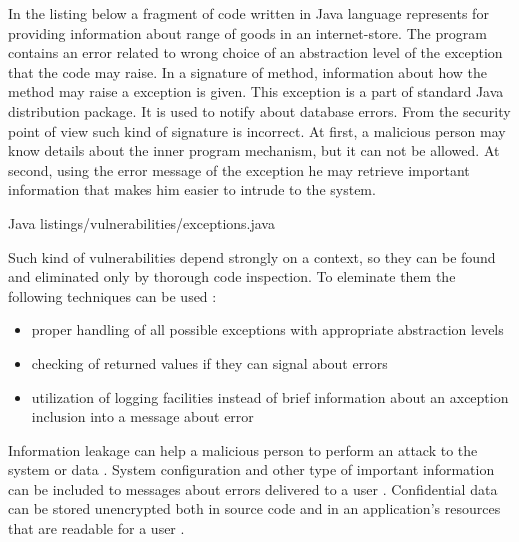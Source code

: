 %
In the listing below a fragment of code written in Java language represents  for providing information about range of goods in an internet-store. 
%
The program contains an error related to wrong choice of an abstraction level of the exception that the code may raise. 
%
In a signature of  method, information about how the method may raise a  exception is given. 
%
This exception is a part of standard Java distribution package. 
%
It is used to notify about database errors. 
%
From the security point of view such kind of signature is incorrect. 
%
At first, a malicious person may know details about the inner program mechanism, but it can not be allowed. 
%
At second, using the error message of the exception he may retrieve important information that makes him easier to intrude to the system. 

	{Java}
	{listings/vulnerabilities/exceptions.java}

%
Such kind of vulnerabilities depend strongly on a context, so they can be found and eliminated only by thorough code inspection. 
%
To eleminate them the following techniques can be used :
\begin{itemize}
	\item proper handling of all possible exceptions with appropriate abstraction levels
	\item checking of returned values if they can signal about errors
	\item utilization of logging facilities instead of brief information about an axception inclusion into a message about error
\end{itemize}



%
Information leakage can help a malicious person to perform an attack to the system or data . 
%
System configuration and other type of important information can be included to messages about errors delivered to a user . 
%
Confidential data can be stored unencrypted both in source code and in an application's resources that are readable for a user .

